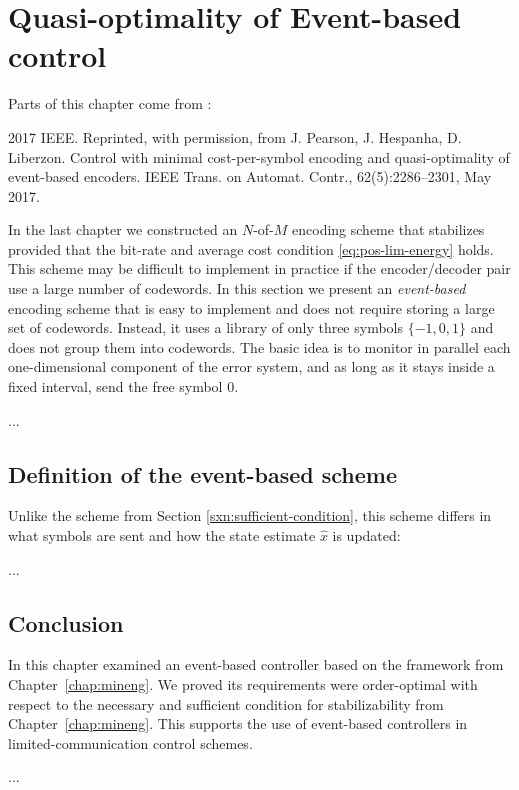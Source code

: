 
\chapter{Quasi-optimality of Event-based control}
\label{sxn:event-driven-encoders}


Parts of this chapter come from \cite{PearsonHespanhaLiberzonMay2017}:

2017 IEEE. Reprinted, with permission, from J. Pearson, J. Hespanha, D. Liberzon. Control with minimal cost-per-symbol encoding and quasi-optimality of event-based encoders. IEEE Trans. on Automat. Contr., 62(5):2286--2301, May 2017.




In the last chapter we constructed an $N$-of-$M$
encoding scheme that stabilizes \theprocess{} provided that the
bit-rate and average cost condition \eqref{eq:pos-lim-energy}
holds. This scheme may be difficult to implement in practice if the
encoder/decoder pair use a large number of codewords. In this section
we present an \emph{event-based} encoding scheme that is easy to
implement and does not require storing a large
set of codewords. Instead, it uses a library of only three symbols
$\{-1,0,1\}$ and does not group them into codewords. The basic idea is
to monitor in parallel each one-dimensional component of the error
system, and as long as it stays
inside a fixed interval, send the free symbol $0$. 

...





\section{Definition of the event-based scheme}

Unlike the scheme
from Section \ref{sxn:sufficient-condition}, this scheme differs in
what symbols are sent and how the state estimate $\hat x$ is updated:

...

\section{Conclusion}

In this chapter examined an event-based controller based on the framework from Chapter~\ref{chap:mineng}. We proved its \bitrate{} requirements were
order-optimal with respect to the necessary and sufficient condition
for stabilizability from Chapter~\ref{chap:mineng}. This supports the use of
event-based controllers in limited-communication control schemes.

...